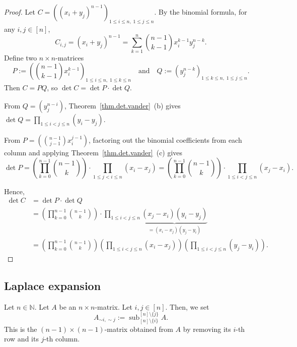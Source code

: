 \begin{proof}
Let $C = \left( (x_i + y_j)^{n-1} \right)_{1 \leq i \leq n,\; 1 \leq j \leq n}$.
By the binomial formula, for any $i, j \in [n]$,
\[
  C_{i,j} = (x_i + y_j)^{n-1}
           = \sum_{k=1}^{n} \binom{n-1}{k-1} x_i^{k-1} y_j^{n-k}.
\]
Define two $n \times n$-matrices
\[
  P := \left( \binom{n-1}{k-1} x_i^{k-1} \right)_{1 \leq i \leq n,\; 1 \leq k \leq n}
  \quad \text{and} \quad
  Q := \left( y_j^{n-k} \right)_{1 \leq k \leq n,\; 1 \leq j \leq n}.
\]
Then $C = PQ$, so $\det C = \det P \cdot \det Q$.

From $Q = \left( y_j^{n-i} \right)$, Theorem~\ref{thm.det.vander}~(b) gives
$\det Q = \prod_{1 \leq i < j \leq n} (y_i - y_j)$.

From $P = \left( \binom{n-1}{j-1} x_i^{j-1} \right)$, factoring out the
binomial coefficients from each column and applying
Theorem~\ref{thm.det.vander}~(c) gives
\[
  \det P = \left( \prod_{k=0}^{n-1} \binom{n-1}{k} \right)
           \cdot \prod_{1 \leq j < i \leq n} (x_i - x_j)
         = \left( \prod_{k=0}^{n-1} \binom{n-1}{k} \right)
           \cdot \prod_{1 \leq i < j \leq n} (x_j - x_i).
\]

Hence,
\begin{align*}
  \det C &= \det P \cdot \det Q \\
         &= \left( \prod_{k=0}^{n-1} \binom{n-1}{k} \right)
            \cdot \prod_{1 \leq i < j \leq n}
            \underbrace{(x_j - x_i)(y_i - y_j)}_{= (x_i - x_j)(y_j - y_i)} \\
         &= \left( \prod_{k=0}^{n-1} \binom{n-1}{k} \right)
            \left( \prod_{1 \leq i < j \leq n} (x_i - x_j) \right)
            \left( \prod_{1 \leq i < j \leq n} (y_j - y_i) \right).
\end{align*}
\end{proof}

\subsection{Laplace expansion}

\begin{convention}
\label{conv.mat.tilde}
\leanok
Let $n \in \mathbb{N}$. Let $A$ be an $n \times n$-matrix.
Let $i, j \in [n]$. Then, we set
\[
  A_{\sim i, \sim j} := \operatorname{sub}_{[n] \setminus \{i\}}^{[n] \setminus \{j\}} A.
\]
This is the $(n-1) \times (n-1)$-matrix obtained from $A$ by removing its
$i$-th row and its $j$-th column.
\end{convention}

